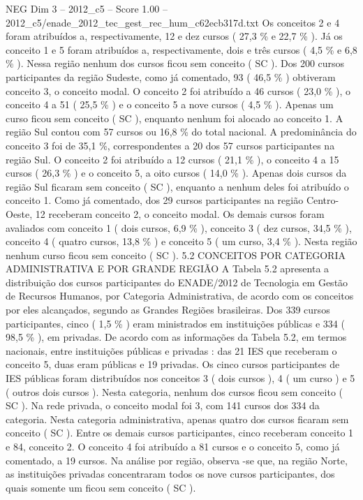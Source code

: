 \begin{textsample}{NEG Dim 3 – 2012\_c5 – Score 1.00 – 2012\_c5/enade\_2012\_tec\_gest\_rec\_hum\_c62ecb317d.txt}
Os conceitos 2 e 4 foram atribuídos a, respectivamente, 12 e dez cursos ( 27,3 \% e 22,7 \% ).
Já os conceito 1 e 5 foram atribuídos a, respectivamente, dois e três cursos ( 4,5 \% e 6,8 \% ).
Nessa região nenhum dos cursos ficou sem conceito ( SC ).
Dos 200 cursos participantes da região Sudeste, como já comentado, 93 ( 46,5 \% ) obtiveram conceito 3, o conceito modal.
O conceito 2 foi atribuído a 46 cursos ( 23,0 \% ), o conceito 4 a 51 ( 25,5 \% ) e o conceito 5 a nove cursos ( 4,5 \% ).
Apenas um curso ficou sem conceito ( SC ), enquanto nenhum foi alocado ao conceito 1.
A região Sul contou com 57 cursos ou 16,8 \% do total nacional.
A predominância do conceito 3 foi de 35,1 \%, correspondentes a 20 dos 57 cursos participantes na região Sul.
O conceito 2 foi atribuído a 12 cursos ( 21,1 \% ), o conceito 4 a 15 cursos ( 26,3 \% ) e o conceito 5, a oito cursos ( 14,0 \% ).
Apenas dois cursos da região Sul ficaram sem conceito ( SC ), enquanto a nenhum deles foi atribuído o conceito 1.
Como já comentado, dos 29 cursos participantes na região Centro-Oeste, 12 receberam conceito 2, o conceito modal.
Os demais cursos foram avaliados com conceito 1 ( dois cursos, 6,9 \% ), conceito 3 ( dez cursos, 34,5 \% ), conceito 4 ( quatro cursos, 13,8 \% ) e conceito 5 ( um curso, 3,4 \% ).
Nesta região nenhum curso ficou sem conceito ( SC ). 5.2 CONCEITOS POR CATEGORIA ADMINISTRATIVA E POR GRANDE REGIÃO A Tabela 5.2 apresenta a distribuição dos cursos participantes do ENADE/2012 de Tecnologia em Gestão de Recursos Humanos, por Categoria Administrativa, de acordo com os conceitos por eles alcançados, segundo as Grandes Regiões brasileiras.
Dos 339 cursos participantes, cinco ( 1,5 \% ) eram ministrados em instituições públicas e 334 ( 98,5 \% ), em privadas.
De acordo com as informações da Tabela 5.2, em termos nacionais, entre instituições públicas e privadas : das 21 IES que receberam o conceito 5, duas eram públicas e 19 privadas.
Os cinco cursos participantes de IES públicas foram distribuídos nos conceitos 3 ( dois cursos ), 4 ( um curso ) e 5 ( outros dois cursos ).
Nesta categoria, nenhum dos cursos ficou sem conceito ( SC ).
Na rede privada, o conceito modal foi 3, com 141 cursos dos 334 da categoria.
Nesta categoria administrativa, apenas quatro dos cursos ficaram sem conceito ( SC ).
Entre os demais cursos participantes, cinco receberam conceito 1 e 84, conceito 2.
O conceito 4 foi atribuído a 81 cursos e o conceito 5, como já comentado, a 19 cursos.
Na análise por região, observa -se que, na região Norte, as instituições privadas concentraram todos os nove cursos participantes, dos quais somente um ficou sem conceito ( SC ).

\end{textsample}
